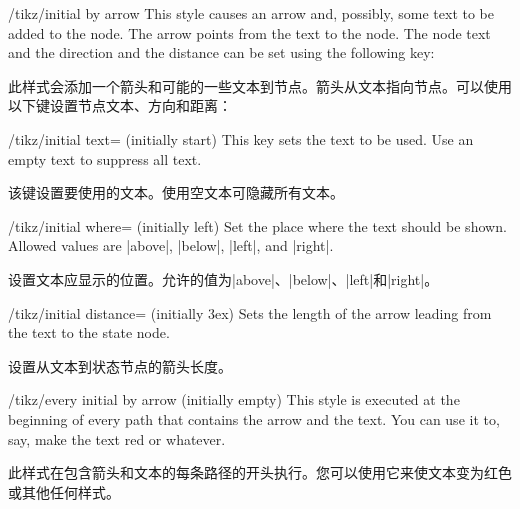 \begin{stylekey}{/tikz/initial by arrow}
    This style causes an arrow and, possibly, some text to be added to the
    node. The arrow points from the text to the node. The node text and the
    direction and the distance can be set using the following key:
    
    此样式会添加一个箭头和可能的一些文本到节点。箭头从文本指向节点。可以使用以下键设置节点文本、方向和距离：


    \begin{key}{/tikz/initial text= (initially start)}
        This key sets the text to be used. Use an empty text to suppress all
        text.

        该键设置要使用的文本。使用空文本可隐藏所有文本。
    \end{key}
    \begin{key}{/tikz/initial where= (initially left)}
        Set the place where the text should be shown. Allowed values are
        |above|, |below|, |left|, and |right|.

        设置文本应显示的位置。允许的值为|above|、|below|、|left|和|right|。


    \end{key}
    \begin{key}{/tikz/initial distance= (initially 3ex)}
        Sets the length of the arrow leading from the text to the state node.

        设置从文本到状态节点的箭头长度。
    \end{key}
    \begin{stylekey}{/tikz/every initial by arrow (initially \normalfont empty)}
        This style is executed at the beginning of every path that contains the
        arrow and the text. You can use it to, say, make the text red or
        whatever.

        此样式在包含箭头和文本的每条路径的开头执行。您可以使用它来使文本变为红色或其他任何样式。
    \end{stylekey}
\begin{codeexample}[preamble={\usetikzlibrary{automata}}]
\end{codeexample}
\end{stylekey}

